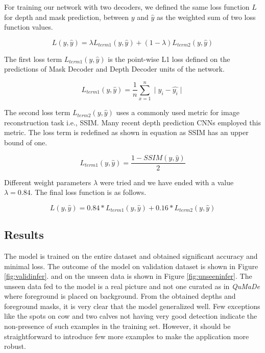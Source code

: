 \documentclass[review]{cvpr}
\begin{document}
For training our network with two decoders, we defined the same loss function $L$ for depth and mask prediction, between $y$ and $\hat{y}$ as the weighted sum of two loss function values.

\begin{equation}
L(y, \hat{y}) = \lambda L_{term1}(y, \hat{y}) + (1 - \lambda) L_{term2}(y, \hat{y})
\end{equation}

The first loss term $L_{term1}(y, \hat{y})$ is the point-wise L1 loss defined on the predictions of Mask Decoder and  Depth Decoder units of the network.

\begin{equation}
L_{term1}(y, \hat{y}) = \frac{1}{n} \sum_{x=1}^{n} \mid y_i - \hat{y_i} \mid
\end{equation}

The second loss term $L_{term2}(y, \hat{y})$ uses a commonly used metric for image reconstruction task i.e., SSIM. Many recent depth prediction CNNs employed this metric. The loss term is redefined as shown in equation as SSIM has an upper bound of one.

\begin{equation}
L_{term1}(y, \hat{y}) = \frac{1 - SSIM(y, \hat{y})}{2}
\end{equation}

Different weight parameters $\lambda$ were tried and we have ended with a value $\lambda = 0.84$. The final loss function is as follows.

\begin{equation}
L(y, \hat{y}) = 0.84 \ast L_{term1}(y, \hat{y}) + 0.16 \ast L_{term2}(y, \hat{y})
\end{equation}


\subsection{Results}
The model is trained on the entire dataset and obtained significant accuracy and minimal loss. The outcome of the model on validation dataset is shown in Figure \ref{fig:validinfer}. and on the unseen data is shown in Figure \ref{fig:unseeninfer}. The unseen data fed to the model is a real picture and not one curated as in \textit{QuMaDe} where foreground is placed on background. From the obtained depths and foreground masks, it is very clear that the model generalized well. Few exceptions like the spots on cow and two calves not having very good detection indicate the non-presence of such examples in the training set. However, it should be straightforward to introduce few more examples to make the application more robust.
\end{document}
